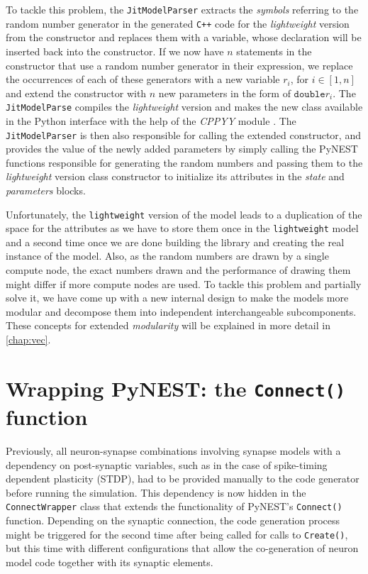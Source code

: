 To tackle this problem, the \texttt{JitModelParser} extracts the \emph{symbols} referring to the random number generator in the generated \texttt{C++} code for the \emph{lightweight} version from the constructor and replaces them with a variable, whose declaration will be inserted back into the constructor. If we now have $n$ statements in the constructor that use a random number generator in their expression, we replace the occurrences of each of these generators with a new variable $r_i$, for $i \in [1, n]$ and extend the constructor with $n$ new parameters in the form of $\texttt{double} r_i$. The \texttt{JitModelParse} compiles the \emph{lightweight} version and makes the new class available in the Python interface with the help of the \emph{CPPYY} module \citep{cppyy}. The \texttt{JitModelParser} is then also responsible for calling the extended constructor, and provides the value of the newly added parameters by simply calling the PyNEST functions responsible for generating the random numbers and passing them to the \emph{lightweight} version class constructor to initialize its attributes in the \emph{state} and \emph{parameters} blocks.

Unfortunately, the \texttt{lightweight} version of the model leads to a duplication of the space for the attributes as we have to store them once in the \texttt{lightweight} model and a second time once we are done building the library and creating the real instance of the model. Also, as the random numbers are drawn by a single compute node, the exact numbers drawn and the performance of drawing them might differ if more compute nodes are used. To tackle this problem and partially solve it, we have come up with a new internal design to make the models more modular and decompose them into independent interchangeable subcomponents. These concepts for extended \emph{modularity} will be explained in more detail in \autoref{chap:vec}.

\section{Wrapping PyNEST: the \texttt{Connect()} function}

Previously, all neuron-synapse combinations involving synapse models with a dependency on post-synaptic variables, such as in the case of spike-timing dependent plasticity (STDP), had to be provided manually to the code generator before running the simulation. This dependency is now hidden in the \texttt{ConnectWrapper} class that extends the functionality of PyNEST's \texttt{Connect()} function. Depending on the synaptic connection, the code generation process might be triggered for the second time after being called for calls to \texttt{Create()}, but this time with different configurations that allow the co-generation of neuron model code together with its synaptic elements.

